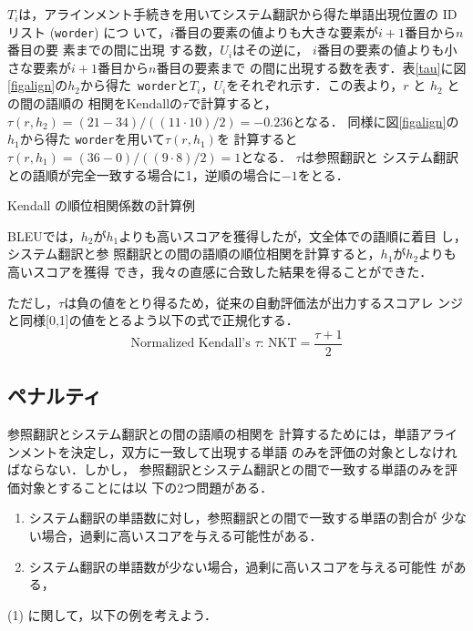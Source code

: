 \documentclass[japanese]{jnlp_1.4}
\begin{document}
$T_i$は，アラインメント手続きを用いてシステム翻訳から得た単語出現位置の
IDリスト (\texttt{worder}) につ
いて，$i$番目の要素の値よりも大きな要素が$i+1$番目から$n$番目の要
素までの間に出現
する数，$U_i$はその逆に，
$i$番目の要素の値よりも小さな要素が$i+1$番目から$n$番目の要素まで
の間に出現する数を表す．表\ref{tau}に図\ref{figalign}の$h_2$から得た{\tt
worder}と$T_i$，$U_i$をそれぞれ示す．この表より，$r$ と $h_2$ との間の語順の
相関をKendallの$\tau$で計算すると，
$\tau(r,{h_2})=(21-34)/((11\cdot10)/2)=-0.236$となる．
同様に図\ref{figalign}の$h_1$から得た \texttt{worder}を用いて$\tau(r,{h_1})$を
計算すると
$\tau(r,{h_1})=(36-0)/((9\cdot8)/2)=1$となる．
$\tau$は参照翻訳と
システム翻訳との語順が完全一致する場合に1，逆順の場合に$-1$をとる．

\begin{table}[t]
  \caption{Kendall の順位相関係数の計算例}
  \label{tau}

\end{table}

BLEUでは，$h_2$が$h_1$よりも高いスコアを獲得したが，文全体での語順に着目
し，システム翻訳と参
照翻訳との間の語順の順位相関を計算すると，$h_1$が$h_2$よりも高いスコアを獲得
でき，我々の直感に合致した結果を得ることができた．

ただし，$\tau$は負の値をとり得るため，従来の自動評価法が出力するスコアレ
ンジと同様[0,1]の値をとるよう以下の式で正規化する．
\begin{equation}
 \text{Normalized Kendall's $\tau$: NKT} =\frac{\tau+1}{2}
\end{equation}


\subsection{ペナルティ}

参照翻訳とシステム翻訳との間の語順の相関を
計算するためには，単語アラインメントを決定し，双方に一致して出現する単語
のみを評価の対象としなければならない．しかし，
参照翻訳とシステム翻訳との間で一致する単語のみを評価対象とすることには以
下の2つ問題がある．

\begin{enumerate}
 \item システム翻訳の単語数に対し，参照翻訳との間で一致する単語の割合が
       少ない場合，過剰に高いスコアを与える可能性がある．
 \item システム翻訳の単語数が少ない場合，過剰に高いスコアを与える可能性
       がある，
\end{enumerate}

(1) に関して，以下の例を考えよう．
\end{document}
